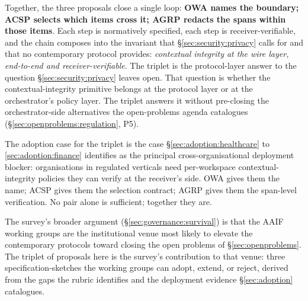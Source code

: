 Together, the three proposals close a single loop:
\textbf{OWA names the boundary; ACSP selects which items
cross it; AGRP redacts the spans within those items}.
Each step is normatively specified, each step is
receiver-verifiable, and the chain composes into the
invariant that \S\ref{sec:security:privacy} calls for and
that no contemporary protocol provides:
\emph{contextual integrity at the wire layer, end-to-end
and receiver-verifiable}. The triplet is the
protocol-layer answer to the question
\S\ref{sec:security:privacy} leaves open. That question is
whether the contextual-integrity primitive belongs at the
protocol layer or at the orchestrator's policy layer. The
triplet answers it without
pre-closing the orchestrator-side alternatives the
open-problems agenda catalogues
(\S\ref{sec:openproblems:regulation}, P5).

The adoption case for the triplet is the case
\S\ref{sec:adoption:healthcare} to \ref{sec:adoption:finance}
identifies as the principal cross-organisational
deployment blocker: organisations in regulated verticals
need per-workspace contextual-integrity policies they
can verify at the receiver's side. OWA gives them the
name; ACSP gives them the selection contract; AGRP
gives them the span-level verification. No pair alone is
sufficient; together they are.

The survey's broader argument
(\S\ref{sec:governance:survival}) is that the AAIF
working groups are the institutional venue most likely
to elevate the contemporary protocols toward closing the
open problems of \S\ref{sec:openproblems}. The triplet
of proposals here is the survey's contribution to that
venue: three specification-sketches the working groups
can adopt, extend, or reject, derived from the gaps the
rubric identifies and the deployment evidence
\S\ref{sec:adoption} catalogues.
\setlength{\emergencystretch}{0pt}
